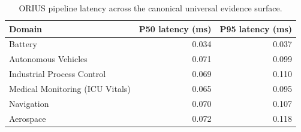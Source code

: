 \begin{table}[htbp]
\centering
\caption{ORIUS pipeline latency across the canonical universal evidence surface.}
\label{tab:all_domain_latency}
\begin{tabular}{lrr}
\toprule
Domain & P50 latency (ms) & P95 latency (ms) \\
\midrule
Battery & 0.034 & 0.037 \\
Autonomous Vehicles & 0.071 & 0.099 \\
Industrial Process Control & 0.069 & 0.110 \\
Medical Monitoring (ICU Vitals) & 0.065 & 0.095 \\
Navigation & 0.070 & 0.107 \\
Aerospace & 0.072 & 0.118 \\
\bottomrule
\end{tabular}
\end{table}
